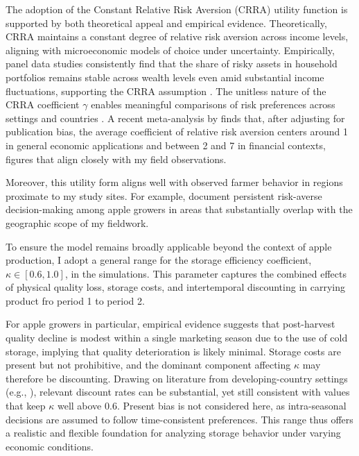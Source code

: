The adoption of the Constant Relative Risk Aversion (CRRA) utility function is supported by both theoretical appeal and empirical evidence. Theoretically, CRRA maintains a constant degree of relative risk aversion across income levels, aligning with microeconomic models of choice under uncertainty. Empirically, panel data studies consistently find that the share of risky assets in household portfolios remains stable across wealth levels even amid substantial income fluctuations, supporting the CRRA assumption \citep{Berger2020Characterizing, chiappori2011relative, zavala2024unfair}. The unitless nature of the CRRA coefficient $\gamma$ enables meaningful comparisons of risk preferences across settings and countries \citep{Szpiro1986Relative, hardaker2000some}. A recent meta-analysis by \citet{Irsova2025Relative} finds that, after adjusting for publication bias, the average coefficient of relative risk aversion centers around 1 in general economic applications and between 2 and 7 in financial contexts, figures that align closely with my field observations.

Moreover, this utility form aligns well with observed farmer behavior in regions proximate to my study sites. For example, \citet{jin2024losses} document persistent risk-averse decision-making among apple growers in areas that substantially overlap with the geographic scope of my fieldwork.


To ensure the model remains broadly applicable beyond the context of apple production, I adopt a general range for the storage efficiency coefficient, $\kappa \in [0.6, 1.0]$, in the simulations. This parameter captures the combined effects of physical quality loss, storage costs, and intertemporal discounting in carrying product fro period 1 to period 2.

For apple growers in particular, empirical evidence suggests that post-harvest quality decline is modest within a single marketing season due to the use of cold storage, implying that quality deterioration is likely minimal. Storage costs are present but not prohibitive, and the dominant component affecting $\kappa$ may therefore be discounting. Drawing on literature from developing-country settings (e.g., \cite{frederick2002time, tanaka2010risk, bauer2012behavioral, saitone2018price, Belissa2019Liquidity, liu2020delayed, Umar2025Drivers}), relevant discount rates can be substantial, yet still consistent with values that keep $\kappa$ well above 0.6. Present bias is not considered here, as intra-seasonal decisions are assumed to follow time-consistent preferences. This range thus offers a realistic and flexible foundation for analyzing storage behavior under varying economic conditions.






